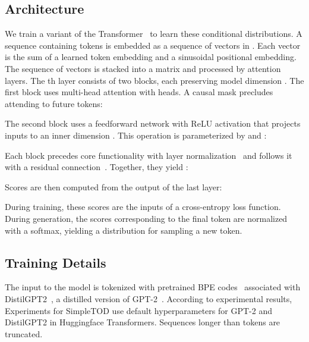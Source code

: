 \documentclass{article}
\begin{document}
\subsection{Architecture} 
\label{ssec:architecture}

We train a variant of the Transformer~\citep{vaswani2017attention} to learn these conditional distributions.
A sequence containing  tokens is embedded as a sequence of  vectors in .
Each vector is the sum of a learned token embedding and a sinusoidal positional embedding.
The sequence of vectors is stacked into a matrix  and processed by  attention layers.
The th layer consists of two blocks, 
each preserving model dimension .
The first block uses multi-head attention with  heads.
A causal mask precludes attending to future tokens:

The second block uses a feedforward network with ReLU activation that projects inputs to an inner dimension . 
This operation is parameterized by  and :

Each block precedes core functionality with layer normalization~\citep{Ba2016LayerN, child2019sparse} and follows it with a residual connection~\citep{he2016deep}. Together, they yield :


Scores are then computed from the output of the last layer:

During training, these scores are the inputs of a cross-entropy loss function.
During generation, the scores corresponding to the final token are normalized with a softmax, yielding a distribution for sampling a new token.

\subsection{Training Details}
\label{ssec:train-detail}
The input to the model is tokenized with pretrained BPE codes~\citep{sennrich-etal-2016-neural} associated with DistilGPT2~\citep{sanh2019distilbert}, a distilled version of GPT-2~\citep{radford2019language}.
According to experimental results, 
Experiments for SimpleTOD use default hyperparameters for GPT-2 and DistilGPT2 in Huggingface Transformers\citep{wolf2019transformers}.
Sequences longer than  tokens are truncated.
\end{document}
